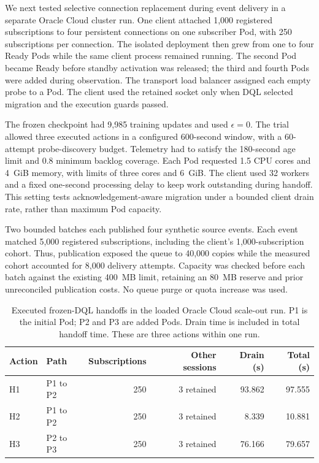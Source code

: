 We next tested selective connection replacement during event delivery in a
separate Oracle Cloud cluster run. One client attached 1,000 registered
subscriptions to four persistent connections on one subscriber Pod, with
250 subscriptions per connection. The isolated deployment then grew from
one to four Ready Pods while the same client process remained running.
The second Pod became Ready before standby activation was released; the
third and fourth Pods were added during observation. The transport load
balancer assigned each empty probe to a Pod. The client used the retained
socket only when DQL selected migration and the execution guards passed.

The frozen checkpoint had 9,985 training updates and used $\epsilon=0$.
The trial allowed three executed actions in a configured 600-second window,
with a 60-attempt probe-discovery budget. Telemetry had to satisfy the
180-second age limit and 0.8 minimum backlog coverage. Each Pod requested
1.5 CPU cores and 4~GiB memory, with limits of three cores and 6~GiB.
The client used 32 workers and a fixed one-second processing delay to keep
work outstanding during handoff. This setting tests acknowledgement-aware
migration under a bounded client drain rate, rather than maximum Pod capacity.

Two bounded batches each published four synthetic source events. Each event
matched 5,000 registered subscriptions, including the client's 1,000-subscription
cohort. Thus, publication exposed the queue to 40,000 copies while the measured
cohort accounted for 8,000 delivery attempts. Capacity was checked before each
batch against the existing 400~MB limit, retaining an 80~MB reserve and prior
unreconciled publication costs. No queue purge or quota increase was used.

\begin{table}[!htbp]
  \centering
  \small
  \caption{Executed frozen-DQL handoffs in the loaded Oracle Cloud scale-out
  run. P1 is the initial Pod; P2 and P3 are added Pods. Drain time is included
  in total handoff time. These are three actions within one run.}
  \label{tab:live-dql-loaded-handoffs}
  \begin{tabular}{llrrrr}
    \toprule
    Action & Path & Subscriptions & Other sessions & Drain (s) & Total (s) \\
    \midrule
    H1 & P1 to P2 & 250 & 3 retained & 93.862 & 97.555 \\
    H2 & P1 to P2 & 250 & 3 retained & 8.339 & 10.881 \\
    H3 & P2 to P3 & 250 & 3 retained & 76.166 & 79.657 \\
    \bottomrule
  \end{tabular}
\end{table}

